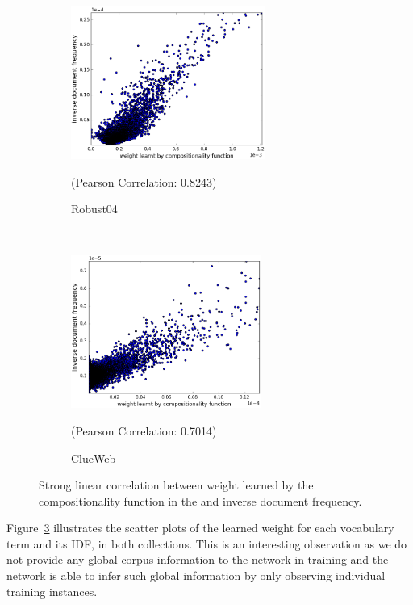 \begin{figure}[!t]%
    \centering
    \begin{subfigure}[t]{0.45\textwidth}
        \centering
        \includegraphics[height=5cm]{03-part-02/chapter-04/figs_and_tables/plot_composionality_idf_scatter_robust.png}
        \caption{\label{fig:scatter_r}Robust04}{\scriptsize{(Pearson Correlation: 0.8243)}}
    \end{subfigure}%
    ~
    \begin{subfigure}[t]{0.45\textwidth}
        \centering
        \includegraphics[height=5cm]{03-part-02/chapter-04/figs_and_tables/plot_composionality_idf_scatter_clueweb.png}
        \caption{\label{fig:scatter_c}ClueWeb}{\scriptsize{(Pearson Correlation: 0.7014)}}
    \end{subfigure}%
    \caption{\label{fig:scatter}Strong linear correlation between weight learned by the compositionality function in the \feedthree and inverse document frequency.}
\end{figure}
%
Figure~\ref{fig:scatter} illustrates the scatter plots of the learned weight for each vocabulary term and its IDF, in both collections.
This is an interesting observation as we do not provide any global corpus information to the network in training and the network is able to infer such global information by only observing individual training instances.


